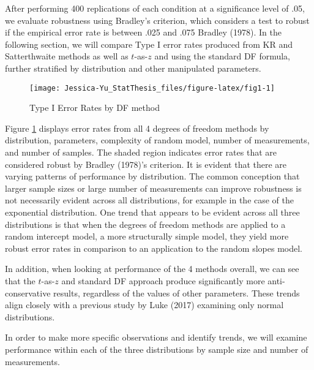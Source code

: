 \documentclass[12pt, twoside]{amherstthesis}
\begin{document}
After performing 400 replications of each condition at a significance level of .05, we evaluate robustness using Bradley's criterion, which considers a test to robust if the empirical error rate is between .025 and .075 Bradley (1978). In the following section, we will compare Type I error rates produced from KR and Satterthwaite methods as well as \(t\)-as-\(z\) and using the standard DF formula, further stratified by distribution and other manipulated parameters.
\begin{figure}

{\centering \texttt{[image: Jessica-Yu\_StatThesis\_files/figure-latex/fig1-1]} 

}

\caption{Type I Error Rates by DF method}\label{fig:fig1}
\end{figure}
Figure \ref{fig:fig1} displays error rates from all 4 degrees of freedom methods by distribution, parameters, complexity of random model, number of measurements, and number of samples. The shaded region indicates error rates that are considered robust by Bradley (1978)'s criterion. It is evident that there are varying patterns of performance by distribution. The common conception that larger sample sizes or large number of measurements can improve robustness is not necessarily evident across all distributions, for example in the case of the exponential distribution. One trend that appears to be evident across all three distributions is that when the degrees of freedom methods are applied to a random intercept model, a more structurally simple model, they yield more robust error rates in comparison to an application to the random slopes model.

In addition, when looking at performance of the 4 methods overall, we can see that the \(t\)-as-\(z\) and standard DF approach produce significantly more anti-conservative results, regardless of the values of other parameters. These trends align closely with a previous study by Luke (2017) examining only normal distributions.

In order to make more specific observations and identify trends, we will examine performance within each of the three distributions by sample size and number of measurements.
\end{document}
